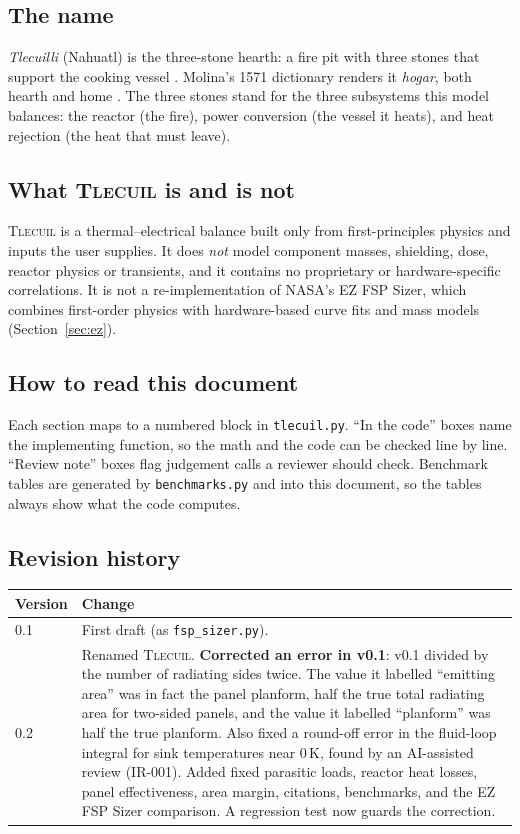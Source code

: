 \documentclass[11pt]{article}
\numberwithin{equation}{section}
\numberwithin{table}{section}
\newcommand{\tlecuil}{\textsc{Tlecuil}}
\begin{document}
\subsection{The name}
\emph{Tlecuilli} (Nahuatl) is the three-stone hearth: a fire pit with three
stones that support the cooking vessel \cite{karttunen1992}. Molina's 1571
dictionary renders it \emph{hogar}, both hearth and home \cite{wired_tlecuilli}. The
three stones stand for the three subsystems this model balances: the reactor (the
fire), power conversion (the vessel it heats), and heat rejection (the heat that
must leave).

\subsection{What \tlecuil{} is and is not}
\tlecuil{} is a thermal--electrical balance built only from first-principles physics
and inputs the user supplies. It does \emph{not} model component masses,
shielding, dose, reactor physics or transients, and it contains no proprietary or
hardware-specific correlations. It is not a re-implementation of NASA's EZ FSP
Sizer, which combines first-order physics with hardware-based curve fits and mass
models \cite{mason2025trades} (Section~\ref{sec:ez}).

\subsection{How to read this document}
Each section maps to a numbered block in \texttt{tlecuil.py}. ``In the code''
boxes name the implementing function, so the math and the code can be checked line
by line. ``Review note'' boxes flag judgement calls a reviewer should check.
Benchmark tables are generated by \texttt{benchmarks.py} and \verb|| into
this document, so the tables always show what the code computes.

\subsection{Revision history}
\begin{center}
\begin{tabular}{lp{}}
\toprule
Version & Change\\
\midrule
0.1 & First draft (as \texttt{fsp\_sizer.py}).\\
0.2 & Renamed \tlecuil{}. \textbf{Corrected an error in v0.1}: v0.1 divided by the
number of radiating sides twice. The value it labelled ``emitting area'' was in fact
the panel planform, half the true total radiating area for two-sided panels, and the
value it labelled ``planform'' was half the true planform. Also fixed a round-off
error in the fluid-loop integral for sink temperatures near 0\,K, found by an
AI-assisted review (IR-001). Added fixed parasitic loads, reactor heat losses, panel
effectiveness, area margin, citations, benchmarks, and the EZ FSP Sizer
comparison. A regression test now guards the correction.\\
\bottomrule
\end{tabular}
\end{center}
\end{document}
